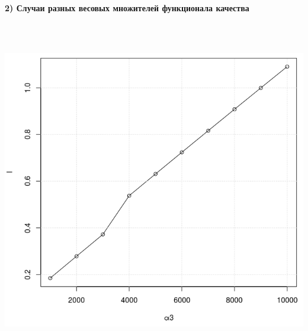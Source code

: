 \documentclass[14pt]{extreport}
\begin{document}
\newpage
\begin{landscape}
\begin{center}
\textbf{2) Случаи разных весовых множителей функционала качества}
\end{center}
\begin{center}
\includegraphics[width=15cm, height=15cm]{laa1.png}
\end{center}
\end{landscape}
\end{document}
